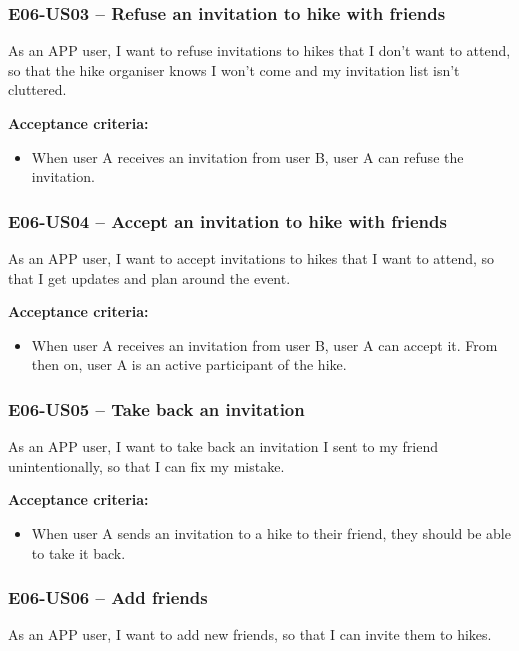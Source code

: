 \subsubsection*{E06-US03 -- Refuse an invitation to hike with friends}
As an APP user, I want to refuse invitations to hikes that I don't want to attend, so that the hike organiser knows I won't come and my invitation list isn't cluttered.

\textbf{Acceptance criteria:}
\begin{itemize}
    \item When user A receives an invitation from user B, user A can refuse the invitation.
\end{itemize}

\subsubsection*{E06-US04 -- Accept an invitation to hike with friends}
As an APP user, I want to accept invitations to hikes that I want to attend, so that I get updates and plan around the event.

\textbf{Acceptance criteria:}
\begin{itemize}
    \item When user A receives an invitation from user B, user A can accept it. From then on, user A is an active participant of the hike.
\end{itemize}

\subsubsection*{E06-US05 -- Take back an invitation}
As an APP user, I want to take back an invitation I sent to my friend unintentionally, so that I can fix my mistake.

\textbf{Acceptance criteria:}
\begin{itemize}
    \item When user A sends an invitation to a hike to their friend, they should be able to take it back.
\end{itemize}


\subsubsection*{E06-US06 -- Add friends}
As an APP user, I want to add new friends, so that I can invite them to hikes.

